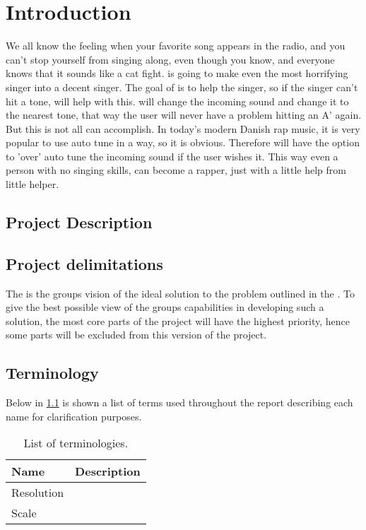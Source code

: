 
\chapter{Introduction}
\label{sec:introduction}
We all know the feeling when your favorite song appears in the radio, and you can't stop yourself from singing along, even though you know, and everyone knows that it sounds like a cat fight.
\systemName is going to make even the most horrifying singer into a decent singer.
The goal of \systemName is to help the singer, so if the singer can't hit a tone, \systemName will help with this. \systemName will change the incoming sound and change it to the nearest tone, that way the user will never have a problem hitting an A' again.
But this is not all \systemName can accomplish. In today's modern Danish rap music, it is very popular to use auto tune in a way, so it is obvious.
Therefore \systemName will have the option to 'over' auto tune the incoming sound if the user wishes it.
This way even a person with no singing skills, can become a rapper, just with a little help from little helper.

\section{Project Description}
\label{sec:projectDescription}


\section{Project delimitations}
\label{sec:delimitations}
The  is the groups vision of the ideal solution to the problem outlined in the .  
To give the best possible view of the groups capabilities in developing such a solution, the most core parts of the project will have the highest priority, hence some parts will be excluded from this version of the project. 

\section{Terminology}
\label{sec:terminology}
Below in \cref{tab:terminology} is shown a list of terms used throughout the report describing each name for clarification purposes.

\begin{table}[H]
	\centering
	\begin{tabularx}{0.8\textwidth}{l X}
		\toprule
		\textbf{Name} & \textbf{Description} \\
		\midrule
		Resolution & \\
		Scale & \\
		\bottomrule
	\end{tabularx}
	\caption{List of terminologies.}
	\label{tab:terminology}
\end{table}